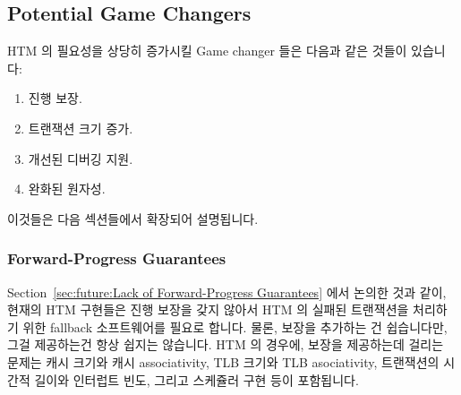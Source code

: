 \subsection{Potential Game Changers}
\label{sec:future:Potential Game Changers}

HTM 의 필요성을 상당히 증가시킬 Game changer 들은 다음과 같은 것들이 있습니다:
\iffalse

Game changers that could greatly increase the need for HTM include
the following:
\fi

\begin{enumerate}
\item	진행 보장.
\item	트랜잭션 크기 증가.
\item	개선된 디버깅 지원.
\item	완화된 원자성.
\iffalse

\item	Forward-progress guarantees.
\item	Transaction-size increases.
\item	Improved debugging support.
\item	Weak atomicity.
\fi
\end{enumerate}

이것들은 다음 섹션들에서 확장되어 설명됩니다.
\iffalse

These are expanded upon in the following sections.
\fi

\subsubsection{Forward-Progress Guarantees}
\label{sec:future:Forward-Progress Guarantees}

Section~\ref{sec:future:Lack of Forward-Progress Guarantees} 에서 논의한 것과
같이, 현재의 HTM 구현들은 진행 보장을 갖지 않아서 HTM 의 실패된 트랜잭션을
처리하기 위한 fallback 소프트웨어를 필요로 합니다.
물론, 보장을 추가하는 건 쉽습니다만, 그걸 제공하는건 항상 쉽지는 않습니다.
HTM 의 경우에, 보장을 제공하는데 걸리는 문제는 캐시 크기와 캐시 associativity,
TLB 크기와 TLB asociativity, 트랜잭션의 시간적 길이와 인터럽트 빈도, 그리고
스케쥴러 구현 등이 포함됩니다.
\iffalse

As was discussed in
Section~\ref{sec:future:Lack of Forward-Progress Guarantees},
current HTM implementations lack forward-progress guarantees, which requires
that fallback software be available to handle HTM failures.
Of course, it is easy to demand guarantees, but not always easy
to provide them.
In the case of HTM, obstacles to guarantees can include cache size and
associativity, TLB size and associativity, transaction duration and
interrupt frequency, and scheduler implementation.
\fi

